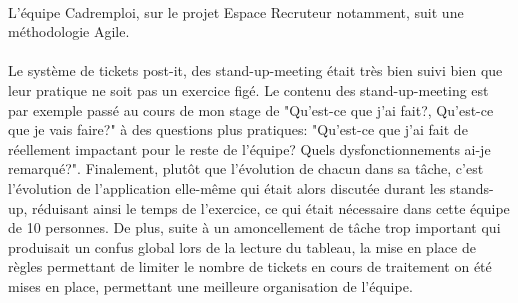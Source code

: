 \paragraph{}
L'équipe Cadremploi, sur le projet Espace Recruteur notamment, suit une méthodologie Agile.

\paragraph{}
Le système de tickets post-it, des stand-up-meeting était très bien suivi bien que leur pratique ne soit pas un exercice figé.
Le contenu des stand-up-meeting est par exemple passé au cours de mon stage de "Qu'est-ce que j'ai fait?, Qu'est-ce que je vais faire?" à des questions plus pratiques: "Qu'est-ce que j'ai fait de réellement impactant pour le reste de l'équipe? Quels dysfonctionnements ai-je remarqué?".
Finalement, plutôt que l'évolution de chacun dans sa tâche, c'est l'évolution de l'application elle-même qui était alors discutée durant les stands-up, réduisant ainsi le temps de l'exercice, ce qui était nécessaire dans cette équipe de 10 personnes.
De plus, suite à un amoncellement de tâche trop important qui produisait un confus global lors de la lecture du tableau, la mise en place de règles permettant de limiter le nombre de tickets en cours de traitement on été mises en place, permettant une meilleure organisation de l'équipe.

